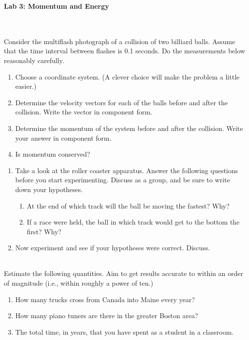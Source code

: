 \documentclass[12pt]{article}
\begin{document}
\pagestyle{empty}

\begin{center}
{\large {\bf Lab 3: Momentum and Energy}}\\
\end{center}

\hspace{2mm}\\

\\

\noindent Consider the multiflash photograph of a collision of two
billiard balls. Assume that the time interval between flashes is 0.1
seconds. Do the measurements below reasonably carefully. 

\begin{enumerate}
\setlength{\itemsep}{0mm}
   \item Choose a coordinate system. (A clever choice will make the
     problem a little easier.) 
   \item Determine the velocity vectors for each of the balls before
     and after the collision. Write the vector in component form. 
   \item Determine the momentum of the system before and after the
     collision. Write your answer in component form. 
   \item Is momentum conserved? \\
\end{enumerate}


\begin{enumerate}
\setlength{\itemsep}{0mm}
   \item Take a look at the roller coaster apparatus. Answer the
   following questions before you start experimenting. Discuss as a
   group, and be sure to write down your hypotheses. 
\begin{enumerate}
\setlength{\itemsep}{-1mm}
   \item At the end of which track will the ball be moving the fastest? Why?
   \item If a race were held, the ball in which track would get to the
   bottom the first? Why?  
\end{enumerate}
   \item Now experiment and see if your hypotheses were correct. Discuss. \\
\end{enumerate}


\\


\noindent Estimate the following quantities.  Aim to get results
accurate to within an order of magnitude (i.e., within roughly a power
of ten.)
\begin{enumerate}
  \setlength{\itemsep}{-1mm}
     \item How many trucks cross from Canada into Maine every year?
     \item How many piano tuners are there in the greater Boston area?  
      \item The total time, in years, that you have spent as a student
      in a classroom.  
\end{enumerate}
\end{document}
